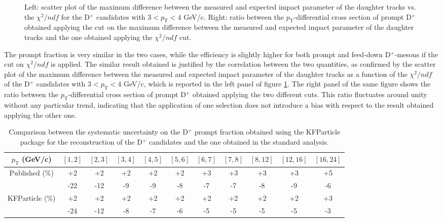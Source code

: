 \documentclass[b5paper,10pt,twoside,oldstyle,classica]{toptesi}
\newcommand{\pt}{p_\text{T}}
\begin{document}
\begin{figure}[tb]
\begin{center}
\caption{Left: scatter plot of the maximum difference between the measured and expected impact parameter of the daughter tracks vs. the $\chi^2/ndf$ for the D$^+$ candidates with $3<\pt<4$ GeV/c. Right: ratio between the $\pt$-differential cross section of prompt D$^+$ obtained applying the cut on the maximum difference between the measured and expected impact parameter of the daughter tracks and the one obtained applying the $\chi^{2}/ndf$ cut.}
\label{KF_comptopo_1}
\end{center}
\end{figure} The prompt fraction is very similar in the two cases, while the efficiency is slightly higher for both prompt and feed-down D$^+$-mesons if the cut on $\chi^2/ndf$ is applied. The similar result obtained is justified by the correlation between the two quantities, as confirmed by the scatter plot of the maximum difference between the measured and expected impact parameter of the daughter tracks as a function of the $\chi^2/ndf$ of the D$^+$ candidates with $3<\pt<4$ GeV/c, which is reported in the left panel of figure \ref{KF_comptopo_1}. The right panel of the same figure shows the ratio between the $\pt$-differential cross section of prompt D$^+$ obtained applying the two different cuts. 
This ratio fluctuates around unity without any particular trend, indicating that the application of one selection does not introduce a bias with respect to the result obtained applying the other one. 
\begin{table}[b]
\centering 
\begin{center} %
\renewcommand\arraystretch{1.4} 
\fontsize{7.5}{10}\selectfont
\begin{tabular}{|c|c|c|c|c|c|c|c|c|c|c|}
\hline
$\pt$ (GeV/c) & $[1,2]$ & $[2,3]$ & $[3,4]$ & $[4,5]$ & $[5,6]$ & $[6,7]$ & $[7,8]$ & $[8,12]$ & $[12,16]$ & $[16,24]$\\
\hline
\multirow{2}{*}{Published (\%)}& +2 & +2 & +2 & +2 & +2 & +3 & +3 & +3 & +3 & +5\\
& -22 & -12 & -9 & -9 & -8 & -7 & -7 & -8 & -9 & -6\\
\hline
\multirow{2}{*}{KFParticle (\%)}& +2 & +2 & +2 & +2 & +2 & +2 & +2 & +2 & +2 & +3\\
& -24 & -12 & -8 & -7 & -6 & -5 & -5 & -5 & -5 & -3\\
\hline
\end{tabular} 
\caption{Comparison between the systematic uncertainty on the D$^+$ prompt fraction obtained using the KFParticle package for the reconstruction of the D$^+$ candidates and the one obtained in the standard analysis.}
\label{promptfrac_syst_comp}
\end{center} 
\end{table}
\end{document}
